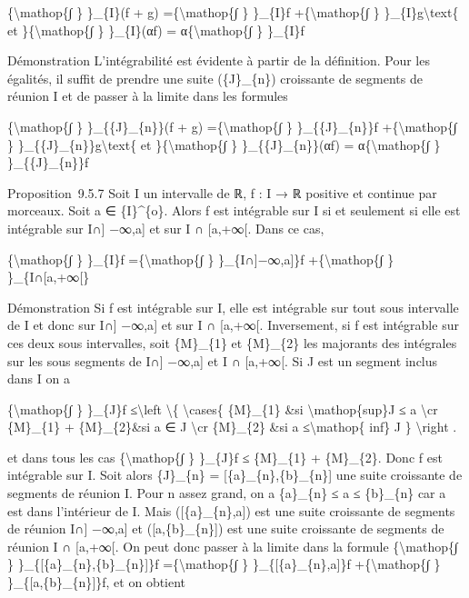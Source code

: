 \documentclass[]{article}
\begin{document}
\{\textbackslash{}mathop\{∫ \} \}\_\{I\}(f + g)
=\{\textbackslash{}mathop\{∫ \} \}\_\{I\}f +\{\textbackslash{}mathop\{∫
\} \}\_\{I\}g\textbackslash{}text\{ et \}\{\textbackslash{}mathop\{∫ \}
\}\_\{I\}(αf) = α\{\textbackslash{}mathop\{∫ \} \}\_\{I\}f

Démonstration L'intégrabilité est évidente à partir de la définition.
Pour les égalités, il suffit de prendre une suite (\{J\}\_\{n\})
croissante de segments de réunion I et de passer à la limite dans les
formules

\{\textbackslash{}mathop\{∫ \} \}\_\{\{J\}\_\{n\}\}(f + g)
=\{\textbackslash{}mathop\{∫ \} \}\_\{\{J\}\_\{n\}\}f
+\{\textbackslash{}mathop\{∫ \}
\}\_\{\{J\}\_\{n\}\}g\textbackslash{}text\{ et
\}\{\textbackslash{}mathop\{∫ \} \}\_\{\{J\}\_\{n\}\}(αf) =
α\{\textbackslash{}mathop\{∫ \} \}\_\{\{J\}\_\{n\}\}f

Proposition~9.5.7 Soit I un intervalle de ℝ, f : I → ℝ positive et
continue par morceaux. Soit a ∈ \{I\}\^{}\{o\}. Alors f est intégrable
sur I si et seulement si elle est intégrable sur I∩{]} −∞,a{]} et sur I
∩ {[}a,+∞{[}. Dans ce cas,

\{\textbackslash{}mathop\{∫ \} \}\_\{I\}f =\{\textbackslash{}mathop\{∫
\} \}\_\{I∩{]}−∞,a{]}\}f +\{\textbackslash{}mathop\{∫ \}
\}\_\{I∩{[}a,+∞{[}\}

Démonstration Si f est intégrable sur I, elle est intégrable sur tout
sous intervalle de I et donc sur I∩{]} −∞,a{]} et sur I ∩ {[}a,+∞{[}.
Inversement, si f est intégrable sur ces deux sous intervalles, soit
\{M\}\_\{1\} et \{M\}\_\{2\} les majorants des intégrales sur les sous
segments de I∩{]} −∞,a{]} et I ∩ {[}a,+∞{[}. Si J est un segment inclus
dans I on a

\{\textbackslash{}mathop\{∫ \} \}\_\{J\}f ≤\textbackslash{}left
\textbackslash{}\{ \textbackslash{}cases\{ \{M\}\_\{1\} \&si
\textbackslash{}mathop\{sup\}J ≤ a \textbackslash{}cr \{M\}\_\{1\} +
\{M\}\_\{2\}\&si a ∈ J \textbackslash{}cr \{M\}\_\{2\} \&si a
≤\textbackslash{}mathop\{ inf\} J \} \textbackslash{}right .

et dans tous les cas \{\textbackslash{}mathop\{∫ \} \}\_\{J\}f ≤
\{M\}\_\{1\} + \{M\}\_\{2\}. Donc f est intégrable sur I. Soit alors
\{J\}\_\{n\} = {[}\{a\}\_\{n\},\{b\}\_\{n\}{]} une suite croissante de
segments de réunion I. Pour n assez grand, on a \{a\}\_\{n\} ≤ a ≤
\{b\}\_\{n\} car a est dans l'intérieur de I. Mais
({[}\{a\}\_\{n\},a{]}) est une suite croissante de segments de réunion
I∩{]} −∞,a{]} et ({[}a,\{b\}\_\{n\}{]}) est une suite croissante de
segments de réunion I ∩ {[}a,+∞{[}. On peut donc passer à la limite dans
la formule \{\textbackslash{}mathop\{∫ \}
\}\_\{{[}\{a\}\_\{n\},\{b\}\_\{n\}{]}\}f =\{\textbackslash{}mathop\{∫ \}
\}\_\{{[}\{a\}\_\{n\},a{]}\}f +\{\textbackslash{}mathop\{∫ \}
\}\_\{{[}a,\{b\}\_\{n\}{]}\}f, et on obtient
\end{document}
